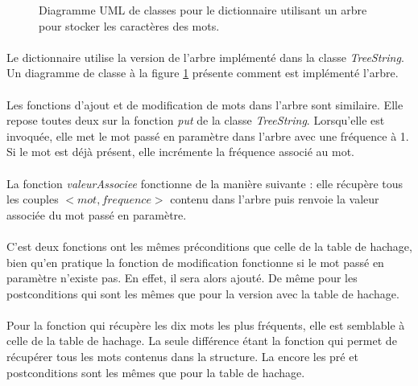 \documentclass[12pt,a4paper,final]{article}
\begin{document}
	\begin{figure}[h]
		\hspace{-2cm}
		
		\caption{Diagramme UML de classes pour le dictionnaire utilisant un arbre pour stocker les caractères des mots.}
		\label{treestring_uml}
	\end{figure}

	\paragraph{}{Le dictionnaire utilise la version de l'arbre implémenté dans la classe \textit{TreeString}. Un diagramme de classe à la figure \ref{treestring_uml} présente comment est implémenté l'arbre.}
    \paragraph{}{Les fonctions d'ajout et de modification de mots dans l'arbre sont similaire. Elle repose toutes deux sur la fonction \textit{put} de la classe \textit{TreeString}. Lorsqu'elle est invoquée, elle met le mot passé en paramètre dans l'arbre avec une fréquence à 1. Si le mot est déjà présent, elle incrémente la fréquence associé au mot.}
    \paragraph{}{La fonction \textit{valeurAssociee} fonctionne de la manière suivante : elle récupère tous les couples $<mot,frequence>$ contenu dans l'arbre puis renvoie la valeur associée du mot passé en paramètre.}

    \paragraph{}{C'est deux fonctions ont les mêmes préconditions que celle de la table de hachage, bien qu'en pratique la fonction de modification fonctionne si le mot passé en paramètre n'existe pas. En effet, il sera alors ajouté. De même pour les postconditions qui sont les mêmes que pour la version avec la table de hachage.}

    \paragraph{}{Pour la fonction qui récupère les dix mots les plus fréquents, elle est semblable à celle de la table de hachage. La seule différence étant la fonction qui permet de récupérer tous les mots contenus dans la structure. La encore les pré et postconditions sont les mêmes que pour la table de hachage.}
\end{document}
